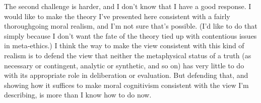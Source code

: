 The second challenge is harder, and I don't know that I have a good response. I would like to make the theory I've presented here consistent with a fairly thoroughgoing moral realism, and I'm not sure that's possible. (I'd like to do that simply because I don't want the fate of the theory tied up with contentious issues in meta-ethics.) I think the way to make the view consistent with this kind of realism is to defend the view that neither the metaphysical status of a truth (as necessary or contingent, analytic or synthetic, and so on) has very little to do with its appropriate role in deliberation or evaluation. But defending that, and showing how it suffices to make moral cognitivism consistent with the view I'm describing, is more than I know how to do now.
